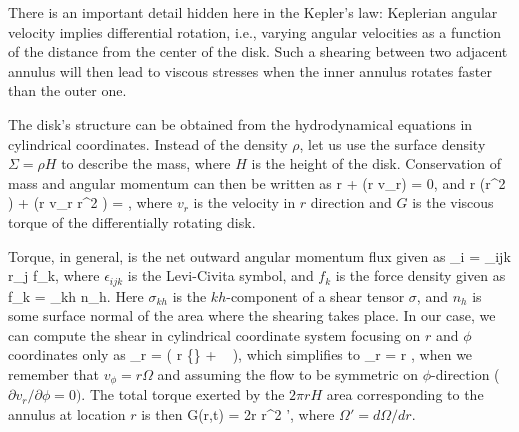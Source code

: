 There is an important detail hidden here in the Kepler's law:
Keplerian angular velocity implies differential rotation, i.e., varying angular velocities as a function of the distance from the center of the disk.
Such a shearing between two adjacent annulus will then lead to viscous stresses when the inner annulus rotates faster than the outer one.

The disk's structure can be obtained from the hydrodynamical equations in cylindrical coordinates.
Instead of the density $\rho$, let us use the surface density $\Sigma = \rho H$ to describe the mass, where $H$ is the height of the disk.
Conservation of mass and angular momentum can then be written as\cite[see e.g.,][for full derivation]{Cho98, FKR02}
\be
r  + (r \Sigma v_r) = 0,
\ee
and
\be
r (\Sigma r^2 \Omega) +  (r \Sigma v_r r^2 \Omega) =  ,
\ee
where $v_r$ is the velocity in $r$ direction and $G$ is the viscous torque of the differentially rotating disk.

Torque, in general, is the net outward angular momentum flux given as
\be
\tau_i = \epsilon_{ijk} r_j f_k,
\ee
where $\epsilon_{ijk}$ is the Levi-Civita symbol, and $f_k$ is the force density given as
\be
f_k = \sigma_{kh} n_h.
\ee
Here $\sigma_{kh}$ is the $kh$-component of a shear tensor $\sigma$, and $n_h$ is some surface normal of the area where the shearing takes place.
In our case, we can compute the shear in cylindrical coordinate system focusing on $r$ and $\phi$ coordinates only as
\be
\sigma_{r\phi} = \rho \nu \left( r  \left\{\right\} +   \right),
\ee
which simplifies to 
\be
\sigma_{r\phi} = \rho \nu r ,
\ee
when we remember that $v_{\phi} = r \Omega$ and assuming the flow to be symmetric on $\phi$-direction ($\partial v_r/\partial \phi = 0)$.
The total torque exerted by the $2\pi r H$ area corresponding to the annulus at location $r$ is then
\be
G(r,t) = 2\pi r \nu \Sigma r^2 \Omega',
\ee
where $\Omega' = d\Omega/dr$.

